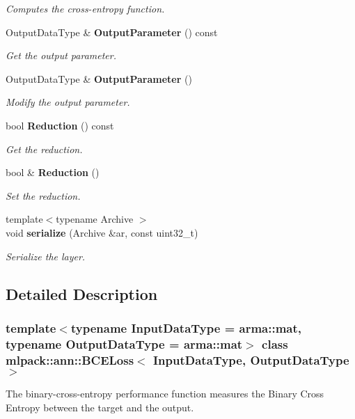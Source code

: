 \begin{DoxyCompactItemize}
\begin{DoxyCompactList}\small\item\em Computes the cross-\/entropy function. \end{DoxyCompactList}\item 
Output\+Data\+Type \& \textbf{ Output\+Parameter} () const
\begin{DoxyCompactList}\small\item\em Get the output parameter. \end{DoxyCompactList}\item 
Output\+Data\+Type \& \textbf{ Output\+Parameter} ()
\begin{DoxyCompactList}\small\item\em Modify the output parameter. \end{DoxyCompactList}\item 
bool \textbf{ Reduction} () const
\begin{DoxyCompactList}\small\item\em Get the reduction. \end{DoxyCompactList}\item 
bool \& \textbf{ Reduction} ()
\begin{DoxyCompactList}\small\item\em Set the reduction. \end{DoxyCompactList}\item 
{\footnotesize template$<$typename Archive $>$ }\\void \textbf{ serialize} (Archive \&ar, const uint32\+\_\+t)
\begin{DoxyCompactList}\small\item\em Serialize the layer. \end{DoxyCompactList}\end{DoxyCompactItemize}


\subsection{Detailed Description}
\subsubsection*{template$<$typename Input\+Data\+Type = arma\+::mat, typename Output\+Data\+Type = arma\+::mat$>$\newline
class mlpack\+::ann\+::\+B\+C\+E\+Loss$<$ Input\+Data\+Type, Output\+Data\+Type $>$}

The binary-\/cross-\/entropy performance function measures the Binary Cross Entropy between the target and the output. 


